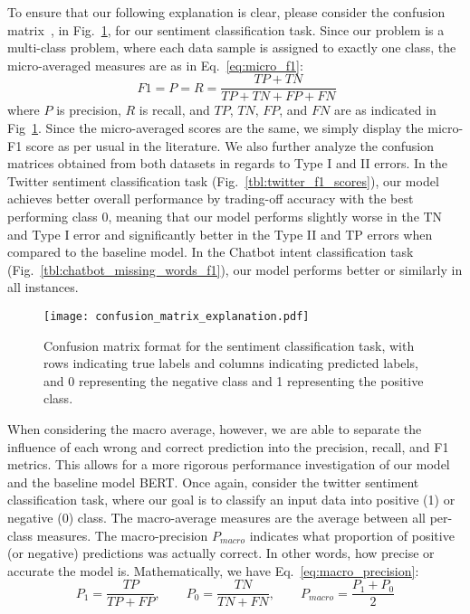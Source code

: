 \documentclass[review]{elsarticle}
\begin{document}
To ensure that our following explanation is clear, please consider the confusion matrix~\cite{sokolova2009systematic}, in Fig.~\ref{fig:confusion_matrix_explanation}, for our sentiment classification task. Since our problem is a multi-class problem, where each data sample is assigned to exactly one class, the micro-averaged measures are as in Eq.~\eqref{eq:micro_f1}:
\begin{equation}~\label{eq:micro_f1}
F1 = P = R = \frac{TP+TN}{TP+TN+FP+FN}
\end{equation}
where $P$ is precision, $R$ is recall, and $TP$, $TN$, $FP$, and $FN$ are as indicated in Fig~\ref{fig:confusion_matrix_explanation}. Since the micro-averaged scores are the same, we simply display the micro-F1 score as per usual in the literature. We also further analyze the confusion matrices obtained from both datasets in regards to Type I and II errors. In the Twitter sentiment classification task (Fig.~\ref{tbl:twitter_f1_scores}), our model achieves better overall performance by trading-off accuracy with the best performing class 0, meaning that our model performs slightly worse in the TN and Type I error and significantly better in the Type II and TP errors when compared to the baseline model. In the Chatbot intent classification task (Fig.~\ref{tbl:chatbot_missing_words_f1}), our model performs better or similarly in all instances.

\begin{figure}
    \centering
    \texttt{[image: confusion\_matrix\_explanation.pdf]}
    \caption{Confusion matrix format for the sentiment classification task, with rows indicating true labels and columns indicating predicted labels, and 0 representing the negative class and 1 representing the positive class.}
    \label{fig:confusion_matrix_explanation}
\end{figure}

When considering the macro average, however, we are able to separate the influence of each wrong and correct prediction into the precision, recall, and F1 metrics. This allows for a more rigorous performance investigation of our model and the baseline model BERT. Once again, consider the twitter sentiment classification task, where our goal is to classify an input data into positive (1) or negative (0) class. The macro-average measures are the average between all per-class measures. The macro-precision $P_{macro}$ indicates what proportion of positive (or negative) predictions was actually correct. In other words, how precise or accurate the model is. Mathematically, we have Eq.~\eqref{eq:macro_precision}:
\begin{equation} \label{eq:macro_precision}
P_1 = \frac{TP}{TP + FP}, \qquad P_0 = \frac{TN}{TN + FN}, \qquad P_{macro} = \frac{P_1 + P_0}{2}
\end{equation}
\end{document}
